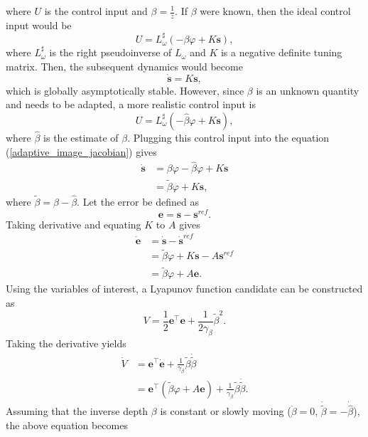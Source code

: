where $U$ is the control input and $\beta=\frac{1}{z}$. If $\beta$ were known, then the ideal control input would be
\begin{equation}
U=L_\omega^\sharp(-\beta\varphi+K\mathbf{s}),
\end{equation}
where $L_\omega^\sharp$ is the right pseudoinverse of $L_\omega$ and $K$ is a negative definite tuning matrix. Then, the subsequent dynamics would become
\begin{equation}
\mathbf{\dot{s}}=K\mathbf{s},
\end{equation}
which is globally asymptotically stable. However, since $\beta$ is an unknown quantity and needs to be adapted, a more realistic control input is
\begin{equation}
U=L_\omega^\sharp(-\hat{\beta}\varphi+K\mathbf{s}),
\end{equation}
where $\hat{\beta}$ is the estimate of $\beta$. Plugging this control input into the equation (\ref{adaptive_image_jacobian}) gives
\begin{align}
\mathbf{\dot{s}}&=\beta\varphi-\hat{\beta}\varphi+K\mathbf{s}
\\&= \tilde{\beta}\varphi+K\mathbf{s},
\end{align}
where $\tilde{\beta}=\beta-\hat{\beta}$. Let the error be defined as 
\begin{equation}
\mathbf{e}=\mathbf{s}-\mathbf{s}^{ref}.
\end{equation}
Taking derivative and equating $K$ to $A$ gives
\begin{align}
\dot{\mathbf{e}}&=\dot{\mathbf{s}}-\dot{\mathbf{s}}^{ref}
\\&=\tilde{\beta}\varphi+K\mathbf{s}-A\mathbf{s}^{ref}
\\&=\tilde{\beta}\varphi+A\mathbf{e}.
\end{align}
Using the variables of interest, a Lyapunov function candidate can be constructed as 
\begin{equation}
V=\frac{1}{2}\mathbf{e}^\top\mathbf{e}+\frac{1}{2\gamma_\beta}\tilde{\beta}^2.
\end{equation}
Taking the derivative yields
\begin{align}
\dot{V}&=\mathbf{e}^\top\dot{\mathbf{e}}+\frac{1}{\gamma_\beta}\tilde{\beta}\dot{\tilde{\beta}}
\\&=\mathbf{e}^\top(\tilde{\beta}\varphi+A\mathbf{e})+\frac{1}{\gamma_\beta}\tilde{\beta}\dot{\tilde{\beta}}.
\label{vdot2}
\end{align}
Assuming that the inverse depth $\beta$ is constant or slowly moving ($\dot{\beta}=0$, $\dot{\tilde{\beta}}=-\dot{\hat{\beta}}$), the above equation becomes
